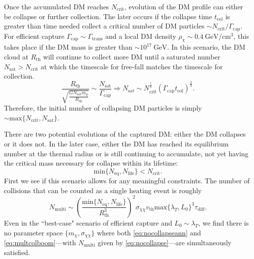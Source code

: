 \documentclass[preprintnumbers,amsmath,amssymb,prd,superscriptaddress]{revtex4}
\newcommand{\GeV}{\text{GeV}}
\newcommand{\cm}{\text{cm}}
\def\r{\right)}
\def\l{\left(}
\begin{document}
Once the accumulated DM reaches $N_\text{crit}$, evolution of the DM profile can either be collapse or further collection.
The later occurs if the collapse time $t_\text{col}$ is greater than time needed collect a critical number of DM particles $\sim N_\text{crit}/\Gamma_\text{cap}$.
For efficient capture $\Gamma_\text{cap} \sim \Gamma_\text{trans}$ and a local DM density $\rho_\chi \sim 0.4 ~\GeV/\cm^3$, this takes place if the DM mass is greater than $\sim 10^{17} ~\GeV$. 
In this scenario, the DM cloud at $R_\text{th}$ will continue to collect more DM until a saturated number $N_\text{sat} > N_\text{crit}$ at which the timescale for free-fall matches the timescale for collection.
\begin{equation}
\frac{R_\text{th}}{\sqrt{\frac{G N_\text{sat} m_\chi}{R_\text{th}}}} \sim \frac{N_\text{sat}}{\Gamma_\text{cap}} \Rightarrow N_\text{sat} \sim N_\text{crit}^\frac{1}{3} (\Gamma_\text{cap} t_\text{col})^\frac{2}{3}. 
\end{equation}
Therefore, the initial number of collapsing DM particles is simply $\sim \text{max}\{N_\text{crit}, N_\text{sat}\}$. 

There are two potential evolutions of the captured DM: either the DM collapses or it does not. 
In the later case, either the DM has reached its equilibrium number at the thermal radius or is still continuing to accumulate, not yet having the critical mass necessary for collapse within its lifetime:
\begin{equation}
\label{eq:nocollapseann}
\text{min}\{N_\text{eq}, N_\text{life}\} < N_\text{crit}.
\end{equation}
First we see if this scenario allows for any meaningful constraints. 
The number of collisions that can be counted as a single heating event is roughly
\begin{equation}
\label{eq:nocollapse}
N_\text{multi} \sim \l \frac{\text{min}\{N_\text{eq}, N_\text{life}\}}{R_\text{th}^3} \r^2 \sigma_{\chi \chi} v_\text{th} \text{max}\{\lambda_T,L_0\}^3 \tau_\text{diff}. 
\end{equation}
Even in the ``best-case" scenario of efficient capture and $L_0 \sim \lambda_T$, we find there is no parameter space $\{m_\chi, \sigma_{\chi \chi}\}$ where both \eqref{eq:nocollapseann} and \eqref{eq:multcolboom}---with $N_\text{multi}$ given by \eqref{eq:nocollapse}---are simultaneously satisfied. 
\end{document}
